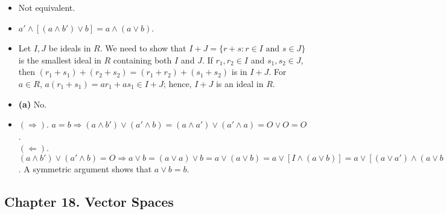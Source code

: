 {\begin{itemize}
 
 
 
\bf\item[8.]\rm
Not equivalent.
 
\bf\item[10.]\rm
$a' \wedge [(a \wedge b') \vee b] = a \wedge (a \vee b)$.

\bf\item[15.]\rm
Let $I, J$ be ideals in $R$. We need to show that $I + J 
= \{ r + s : r \in
I \mbox{ and } s \in J  \}$ is the smallest ideal in $R$ containing
both $I$ and $J$. If $r_1, r_2 \in I$ and $s_1, s_2 \in J$, then
$(r_1 + s_1) + (r_2 + s_2) = (r_1 + r_2) +(s_1 + s_2)$ is in $I + J$.
For $a \in R$, $a(r_1 + s_1) = ar_1 + as_1 \in I + J$; hence, $I + J$
is an ideal in $R$.


\bf\item[19.]\rm
{\bf (a)} No.

\bf\item[21.]\rm
$( \Rightarrow)$. $a = b \Rightarrow (a \wedge b') \vee (a' \wedge b)
= (a \wedge a') \vee (a' \wedge a) = O \vee O = O$. \\
$( \Leftarrow)$. $( a \wedge b') \vee (	a' \wedge b) = O \Rightarrow
a \vee b = (a \vee a) \vee b = a \vee (a \vee b) = a \vee [I \wedge
(a \vee b)] = a \vee [(a \vee a') \wedge (a \vee b)] = [a \vee
(a \wedge b')] \vee [a \vee (a' \wedge b)] = a \vee [(a \wedge b') \vee
(a' \wedge b)] = a \vee 0 = a$.  A symmetric argument shows that $a
\vee b = b$.



 
\end{itemize}
}
 
\subsection*{Chapter 18. Vector Spaces}
 
